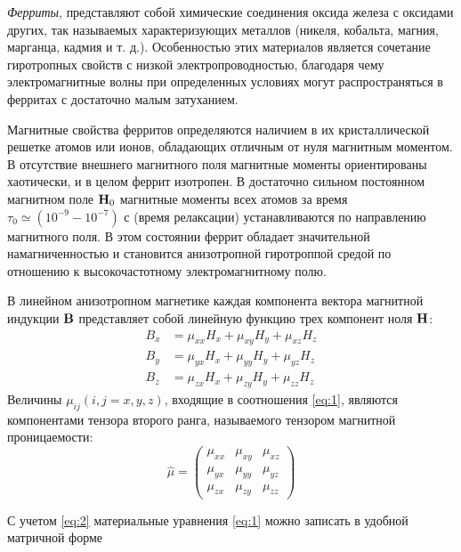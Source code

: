 \textit{Ферриты}, представляют собой химические соединения оксида железа с оксидами других, так называемых характеризующих
металлов (никеля, кобальта, магния, марганца, кадмия и т. д.). Особенностью этих материалов является сочетание
гиротропных свойств с низкой электропроводностью, благодаря чему электромагнитные волны при определенных условиях могут
распространяться в ферритах с достаточно малым затуханием.

Магнитные свойства ферритов определяются наличием в их кристаллической решетке атомов или ионов, обладающих отличным от
нуля магнитным моментом. В отсутствие внешнего магнитного поля магнитные моменты ориентированы хаотически, и в целом
феррит изотропен. В достаточно сильном постоянном магнитном поле $\textbf{H}_0$ магнитные моменты всех атомов за время
$\tau_0 \simeq (10^{-9} - 10^{-7})$ с (время релаксации) устанавливаются по направлению магнитного поля. В этом состоянии феррит обладает
значительной намагниченностью и становится анизотропной гиротроппой средой по отношению к высокочастотному электромагнитному полю.

В линейном анизотропном магнетике каждая компонента вектора магнитной индукции $\textbf{B}$ представляет собой линейную функцию
трех компонент ноля $\textbf{H}$:
\begin{equation}
    \begin{aligned} 
        B_{x} &=\mu_{x x} H_{x}+\mu_{x y} H_{y}+\mu_{x z} H_{z} \\
        B_{y} &=\mu_{y x} H_{x}+\mu_{y y} H_{y}+\mu_{y z} H_{z} \\
        B_{z} &=\mu_{z x} H_{x}+\mu_{z y} H_{y}+\mu_{z z} H_{z}
    \end{aligned}
    \label{eq:1}
\end{equation}
Величины $\mu_{i j}(i,j=x,y,z)$, входящие в соотношения \eqref{eq:1}, являются компонентами тензора второго ранга, называемого
тензором магнитной проницаемости:
\begin{equation}
    \hat{\mu}=\left(\begin{array}
        {ccc}{\mu_{x x}} & {\mu_{x y}} & {\mu_{x z}} \\
        {\mu_{y x}} & {\mu_{y y}} & {\mu_{y z}} \\
        {\mu_{z x}} & {\mu_{z y}} & {\mu_{z z}}
    \end{array}\right)
    \label{eq:2}
\end{equation}


С учетом \eqref{eq:2} материальные уравнения \eqref{eq:1} можно записать в удобной матричной форме

